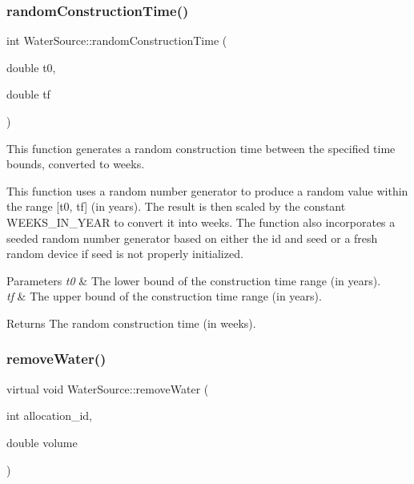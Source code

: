 \subsubsection{\texorpdfstring{random\+Construction\+Time()}{randomConstructionTime()}}
{\footnotesize\ttfamily int Water\+Source\+::random\+Construction\+Time (\begin{DoxyParamCaption}\item[{double}]{t0,  }\item[{double}]{tf }\end{DoxyParamCaption})}



This function generates a random construction time between the specified time bounds, converted to weeks. 

This function uses a random number generator to produce a random value within the range {\ttfamily \mbox{[}t0, tf\mbox{]}} (in years). The result is then scaled by the constant {\ttfamily W\+E\+E\+K\+S\+\_\+\+I\+N\+\_\+\+Y\+E\+AR} to convert it into weeks. The function also incorporates a seeded random number generator based on either the {\ttfamily id} and {\ttfamily seed} or a fresh random device if {\ttfamily seed} is not properly initialized.


\begin{DoxyParams}{Parameters}
{\em t0} & The lower bound of the construction time range (in years). \\
\hline
{\em tf} & The upper bound of the construction time range (in years).\\
\hline
\end{DoxyParams}
\begin{DoxyReturn}{Returns}
The random construction time (in weeks). 
\end{DoxyReturn}
\mbox{\label{classWaterSource_a4a4d948033c57feb8523bd7d5828c59b}} 
\subsubsection{\texorpdfstring{remove\+Water()}{removeWater()}}
{\footnotesize\ttfamily virtual void Water\+Source\+::remove\+Water (\begin{DoxyParamCaption}\item[{int}]{allocation\+\_\+id,  }\item[{double}]{volume }\end{DoxyParamCaption})\hspace{0.3cm}{\ttfamily [virtual]}}



